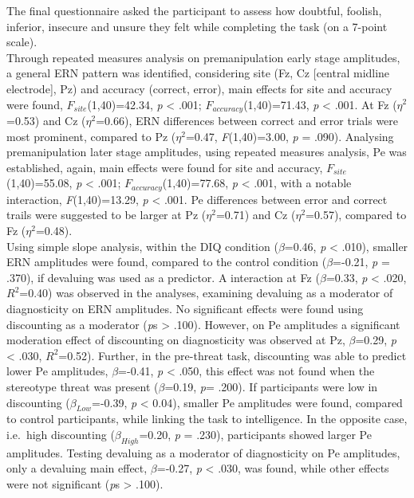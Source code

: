 \documentclass[
  stu]{apa7}
\begin{document}
The final questionnaire asked the participant to assess how doubtful, foolish, inferior, insecure and unsure they felt while completing the task (on a 7-point scale).\\
Through repeated measures analysis on premanipulation early stage amplitudes, a general ERN pattern was identified, considering site (Fz, Cz {[}central midline electrode{]}, Pz) and accuracy (correct, error), main effects for site and accuracy were found, \(F_{site}\)(1,40)=42.34, \emph{p} \textless{} .001; \(F_{accuracy}\)(1,40)=71.43, \emph{p} \textless{} .001.
At Fz (\(\eta^{2}\)=0.53) and Cz (\(\eta^{2}\)=0.66), ERN differences between correct and error trials were most prominent, compared to Pz (\(\eta^{2}\)=0.47, \emph{F}(1,40)=3.00, \emph{p} = .090).
Analysing premanipulation later stage amplitudes, using repeated measures analysis, Pe was established, again, main effects were found for site and accuracy, \(F_{site}\)(1,40)=55.08, \emph{p} \textless{} .001; \(F_{accuracy}\)(1,40)=77.68, \emph{p} \textless{} .001, with a notable interaction, \emph{F}(1,40)=13.29, \emph{p} \textless{} .001.
Pe differences between error and correct trails were suggested to be larger at Pz (\(\eta^{2}\)=0.71) and Cz (\(\eta^{2}\)=0.57), compared to Fz (\(\eta^{2}\)=0.48).\\
Using simple slope analysis, within the DIQ condition (\(\beta\)=0.46, \emph{p} \textless{} .010), smaller ERN amplitudes were found, compared to the control condition (\(\beta\)=-0.21, \emph{p} = .370), if devaluing was used as a predictor.
A interaction at Fz (\(\beta\)=0.33, \emph{p} \textless{} .020, \(R^2\)=0.40) was observed in the analyses, examining devaluing as a moderator of diagnosticity on ERN amplitudes.
No significant effects were found using discounting as a moderator (\emph{p}s \textgreater{} .100).
However, on Pe amplitudes a significant moderation effect of discounting on diagnosticity was observed at Pz, \(\beta\)=0.29, \emph{p} \textless{} .030, \(R^2\)=0.52).
Further, in the pre-threat task, discounting was able to predict lower Pe amplitudes, \(\beta\)=-0.41, \emph{p} \textless{} .050, this effect was not found when the stereotype threat was present (\(\beta\)=0.19, \emph{p}= .200).
If participants were low in discounting (\(\beta_{Low}\)=-0.39, \emph{p} \textless{} 0.04), smaller Pe amplitudes were found, compared to control participants, while linking the task to intelligence.
In the opposite case, i.e.~high discounting (\(\beta_{High}\)=0.20, \emph{p} = .230), participants showed larger Pe amplitudes.
Testing devaluing as a moderator of diagnosticity on Pe amplitudes, only a devaluing main effect, \(\beta\)=-0.27, \emph{p} \textless{} .030, was found, while other effects were not significant (\emph{p}s \textgreater{} .100).\\
\end{document}
